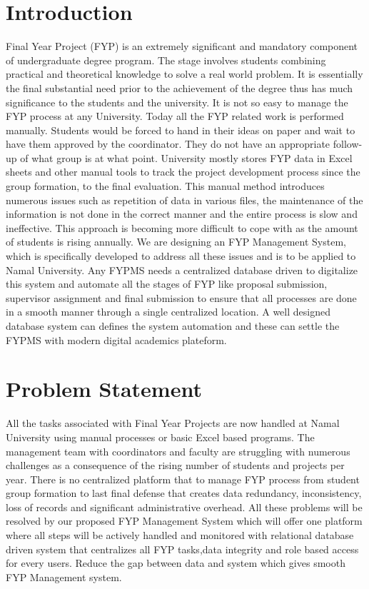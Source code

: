 \documentclass[12pt,a4paper]{report}
\begin{document}
\section{Introduction}
Final Year Project (FYP) is an extremely significant and mandatory component of undergraduate degree program. The stage involves students combining practical and theoretical knowledge to solve a real world problem. It is essentially the final substantial need prior to the achievement of the degree thus has much significance to the students and the university.
It is not so easy to manage the FYP process at any University. Today all the FYP related work is performed manually. Students would be forced to hand in their ideas on paper and wait to have them approved by the coordinator. They do not have an appropriate follow-up of what group is at what point. University mostly stores FYP data in Excel sheets and other manual tools to track the project development process since the group formation, to the final evaluation.
This manual method introduces numerous issues such as repetition of data in various files, the maintenance of the information is not done in the correct manner and the entire process is slow and ineffective. This approach is becoming more difficult to cope with as the amount of students is rising annually. We are designing an FYP Management System, which is specifically developed to address all these issues and is to be applied to Namal University. Any FYPMS needs a centralized database  driven to digitalize this system and automate all the stages of FYP like proposal submission, supervisor assignment and final submission to ensure that all processes are done in a smooth manner through a single centralized location. A well designed database system can defines the system automation and these can settle the FYPMS with modern digital academics plateform.

\section{Problem Statement}


All the tasks associated with Final Year Projects are now handled at Namal University using manual processes or basic Excel based programs. The management team with coordinators and faculty are struggling with numerous challenges as a consequence of the rising number of students and projects per year. There is no centralized platform that to manage FYP process from student group formation to last final defense that creates data redundancy, inconsistency, loss of records and significant administrative overhead.
 All these problems will be resolved by our proposed FYP Management System which will offer one platform where all steps will be actively handled and monitored with relational database driven system that centralizes all FYP tasks,data integrity and role based access for every users. Reduce the gap between data and system which gives smooth FYP Management system.
\end{document}
